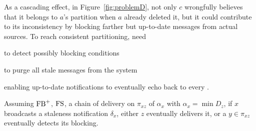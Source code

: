 As a cascading effect, in Figure~\ref{fig:problemD}, not only $c$
wrongfully believes that it belongs to $a$'s partition when $a$
already deleted it, but it could contribute to its inconsistency by
blocking farther but up-to-date messages from actual sources. To reach
consistent partitioning, \processes need
\begin{inparaenum}[(i)]
\item to detect possibly blocking conditions 
\item to purge all stale messages from the system
\item enabling up-to-date notifications to eventually echo back to
  every \process.
\end{inparaenum}

\begin{lemma}
  Assuming $\textup{FB}^+$, $\textup{FS}$, a chain of delivery on
  $\pi_{xz}$ of $\alpha_x$ with $\alpha_x = \min D_z$, if $x$
  broadcasts a staleness notification $\delta_x$, either $z$
  eventually delivers it, or a \process $y\in\pi_{xz}$ eventually
  detects its blocking.
\end{lemma}


